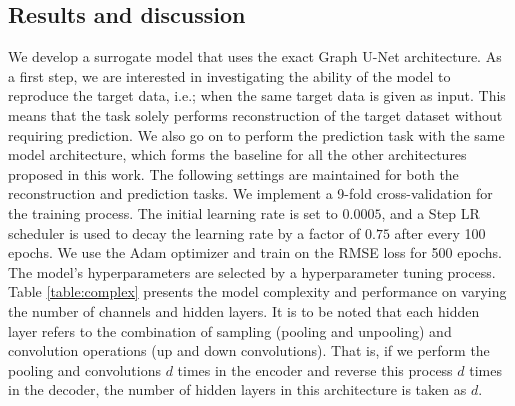 \subsection{Results and discussion}
We develop a surrogate model that uses the exact Graph U-Net architecture. As a first step, we are interested in investigating the ability of the model to reproduce the target data, i.e.; when the same target data is given as input. This means that the task solely performs reconstruction of the target dataset without requiring prediction. We also go on to perform the prediction task with the same model architecture, which forms the baseline for all the other architectures proposed in this work. The following settings are maintained for both the reconstruction and prediction tasks. We implement a 9-fold cross-validation for the training process. The initial learning rate is set to $0.0005$, and a Step LR scheduler is used to decay the learning rate by a factor of $0.75$ after every 100 epochs. We use the Adam optimizer and train on the RMSE loss for 500 epochs. The model's hyperparameters are selected by a hyperparameter tuning process. Table \ref{table:complex} presents the model complexity and performance on varying the number of channels and hidden layers. It is to be noted that each hidden layer refers to the combination of sampling (pooling and unpooling) and convolution operations (up and down convolutions). That is, if we perform the pooling and convolutions $d$ times in the encoder and reverse this process $d$ times in the decoder, the number of hidden layers in this architecture is taken as $d$. \\
